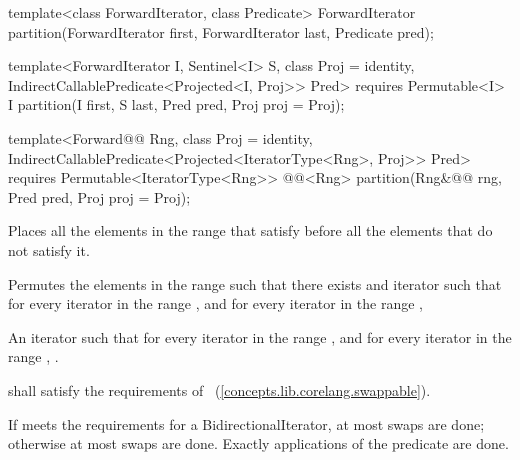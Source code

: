 %
\begin{removedblock}
\begin{itemdecl}
template<class ForwardIterator, class Predicate>
  ForwardIterator
    partition(ForwardIterator first,
              ForwardIterator last, Predicate pred);
\end{itemdecl}
\end{removedblock}
\begin{addedblock}
\begin{itemdecl}
template<ForwardIterator I, Sentinel<I> S, class Proj = identity,
    IndirectCallablePredicate<Projected<I, Proj>> Pred>
  requires Permutable<I>
  I partition(I first, S last, Pred pred, Proj proj = Proj{});

template<Forward@@ Rng, class Proj = identity,
    IndirectCallablePredicate<Projected<IteratorType<Rng>, Proj>> Pred>
  requires Permutable<IteratorType<Rng>>
  @@<Rng>
    partition(Rng&@\newtxt{\&}@ rng, Pred pred, Proj proj = Proj{});
\end{itemdecl}
\end{addedblock}

\begin{itemdescr}
\pnum
\begin{removedblock}
\effects Places all the elements in the range  that satisfy
 before all the elements that do not satisfy it.
\end{removedblock}

\begin{addedblock}
\effects Permutes the elements in the range  such that there exists and iterator 
such that for every iterator  in the range 
, and for every iterator  in the
range , 
\end{addedblock}

\pnum
\returns An iterator  such that for every iterator  in the range 
,
and for every iterator  in the range ,
.

\begin{removedblock}
\pnum
\requires
{} shall satisfy the requirements of
~(\ref{concepts.lib.corelang.swappable}).
\end{removedblock}

\pnum
\complexity If  meets the requirements for a BidirectionalIterator, at most
 swaps are done; otherwise at most  swaps
are done. Exactly  applications of the predicate are done.
\end{itemdescr}

